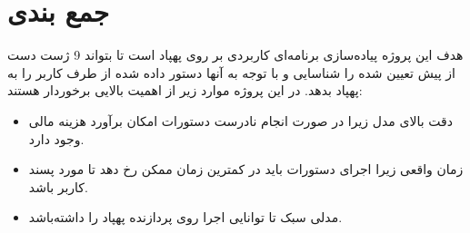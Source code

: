 \section{جمع بندی}
 هدف این پروژه پیاده‌سازی برنامه‌ای کاربردی بر روی پهپاد است تا بتواند 9 ژست دست از پیش تعیین شده را شناسایی و با توجه به آنها دستور داده شده از طرف کاربر را به پهپاد بدهد.
 در این پروژه موارد زیر از اهمیت بالایی برخوردار هستند:
 \begin{itemize}
    \item دقت بالای مدل زیرا در صورت انجام نادرست دستورات امکان برآورد هزینه مالی وجود دارد.
    \item زمان واقعی زیرا اجرای دستورات باید در کمترین زمان ممکن رخ دهد تا مورد پسند کاربر باشد.
    \item مدلی سبک تا توانایی اجرا روی پردازنده پهپاد را داشته‌باشد.
\end{itemize}


